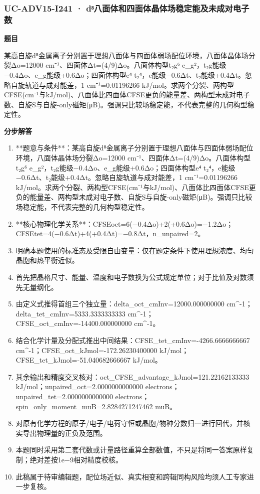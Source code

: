 \documentclass[UTF8,11pt,a4paper]{ctexart}
\begin{document}
\subsubsection*{UC-ADV15-I241 · d⁸八面体和四面体晶体场稳定能及未成对电子数}
\noindent\textbf{题目}\par
某高自旋d⁸金属离子分别置于理想八面体与四面体弱场配位环境，八面体晶体场分裂Δo=12000 cm⁻¹、四面体Δt=(4/9)Δo。八面体构型t₂g⁶ e\_g²，t₂g能级−0.4Δo、e\_g能级+0.6Δo；四面体构型e⁴ t₂⁴，e能级−0.6Δt、t₂能级+0.4Δt。忽略自旋轨道与成对能差，1 cm⁻¹=0.01196266 kJ/mol。求两个分裂、两构型CFSE(cm⁻¹与kJ/mol)、八面体比四面体CFSE更负的能量差、两构型未成对电子数、自旋S与自旋-only磁矩(μB)。强调只比较场稳定能，不代表完整的几何构型稳定性。\par
\medskip\noindent\textbf{分步解答}
\begin{enumerate}
\item **题意与条件**：某高自旋d⁸金属离子分别置于理想八面体与四面体弱场配位环境，八面体晶体场分裂Δo=12000 cm⁻¹、四面体Δt=(4/9)Δo。八面体构型t₂g⁶ e\_g²，t₂g能级−0.4Δo、e\_g能级+0.6Δo；四面体构型e⁴ t₂⁴，e能级−0.6Δt、t₂能级+0.4Δt。忽略自旋轨道与成对能差，1 cm⁻¹=0.01196266 kJ/mol。求两个分裂、两构型CFSE(cm⁻¹与kJ/mol)、八面体比四面体CFSE更负的能量差、两构型未成对电子数、自旋S与自旋-only磁矩(μB)。强调只比较场稳定能，不代表完整的几何构型稳定性。
\item **核心物理化学关系**：CFSEoct=6(−0.4Δo)+2(+0.6Δo)=−1.2Δo；CFSEtet=4(−0.6Δt)+4(+0.4Δt)=−0.8Δt，n\_unpaired=2。
\item 明确本题使用的标准态及受限自由变量：仅在题定条件下使用理想浓度、均匀晶胞和热平衡近似。
\item 首先把晶格尺寸、能量、温度和电子数换为公式规定单位；对于比值及对数须先无量纲化。
\item 由定义式推得首组三个独立量：delta\_oct\_cmInv=12000.000000000 cm\textasciicircum{}-1；delta\_tet\_cmInv=5333.3333333333 cm\textasciicircum{}-1；CFSE\_oct\_cmInv=-14400.000000000 cm\textasciicircum{}-1。
\item 结合化学计量及分配式推出中间结果：CFSE\_tet\_cmInv=-4266.6666666667 cm\textasciicircum{}-1；CFSE\_oct\_kJmol=-172.26230400000 kJ/mol；CFSE\_tet\_kJmol=-51.040682666667 kJ/mol。
\item 其余输出和精度交叉核对：oct\_CFSE\_advantage\_kJmol=121.22162133333 kJ/mol；unpaired\_oct=2.0000000000000 electrons；unpaired\_tet=2.0000000000000 electrons；spin\_only\_moment\_muB=2.8284271247462 muB。
\item 对原有化学方程的原子/电子/电荷守恒或晶胞/物种分数归一进行回代，并核实导出物理量的正负及范围。
\item 本题同时采用第二套代数或计量路径重算全部数值，不只是将同一答案原样复制；绝对差按1e−9相对精度校核。
\item 此稿属于待审编辑题，配位场近似、真实相变和跨辑同构风险均须人工专家进一步复核。
\end{enumerate}
\end{document}
